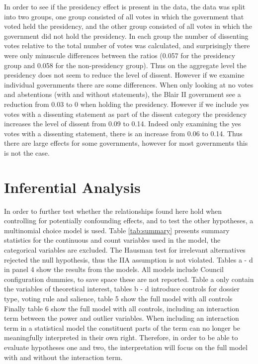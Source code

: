 In order to see if the presidency effect is present in the data, the data was split into two groups, one group consisted of all votes in which the government that voted held the presidency, and the other group consisted of all votes in which the government did not hold the presidency. In each group the number of dissenting votes relative to the total number of votes was calculated, and surprisingly there were only minuscule differences between the ratios (0.057 for the presidency group and 0.058 for the non-presidency group). Thus on the aggregate level the presidency does not seem to reduce the level of dissent. However if we examine individual governments there are some differences. When only looking at no votes and abstentions (with and without statements), the Blair II government see a reduction from 0.03 to 0 when holding the presidency. However if we include yes votes with a dissenting statement as part of the dissent category the presidency increases the level of dissent from 0.09 to 0.14. Indeed only examining the yes votes with a dissenting statement, there is an increase from 0.06 to 0.14. Thus there are large effects for some governments, however for most governments this is not the case.


\section{Inferential Analysis}

In order to further test whether the relationships found here hold when controlling for potentially confounding effects, and to test the other hypotheses, a multinomial choice model is used. Table \ref{tab:summary} presents summary statistics for the continuous and count variables used in the model, the categorical variables are excluded. The Hausman test for irrelevant alternatives rejected the null hypothesis, thus the IIA assumption is not violated. Tables a - d in panel 4 show the results from the models. All models include Council configuration dummies, to save space these are not reported. Table a only contain the variables of theoretical interest, tables b - d introduce controls for dossier type, voting rule and salience, table 5 show the full model with all controls Finally table 6 show the full model with all controls, including an interaction term between the power and outlier variables. When including an interaction term in a statistical model the constituent parts of the term can no longer be meaningfully interpreted in their own right. Therefore, in order to be able to evaluate hypotheses one and two, the interpretation will focus on the full model with and without the interaction term.

